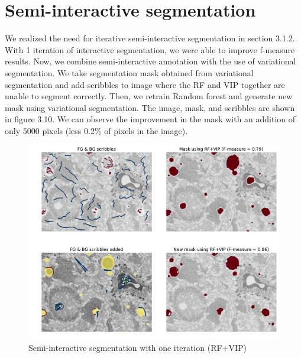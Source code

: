 
\section{Semi-interactive segmentation}
We realized the need for iterative semi-interactive segmentation in section 3.1.2. With 1 iteration of interactive segmentation, we were able to improve f-measure results. Now, we combine semi-interactive annotation with the use of variational segmentation. We take segmentation mask obtained from variational segmentation and add scribbles to image where the RF and VIP together are unable to segment correctly. Then, we retrain Random forest and generate new mask using variational segmentation. The image, mask, and scribbles are shown in figure 3.10. We can observe the improvement in the mask with an addition of only 5000 pixels (less 0.2\% of pixels in the image).
\begin{figure}[h!] \label{fig:semi-vip}
 \includegraphics[width=1.0\linewidth]{figures/semi_inter_vip.pdf}
\caption{Semi-interactive segmentation with one iteration (RF+VIP)}
\end{figure}
